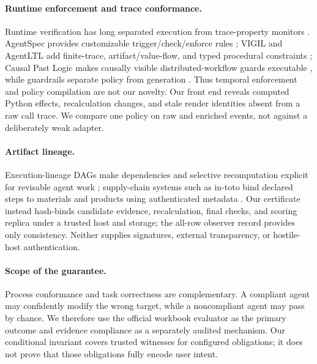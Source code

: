 \paragraph{Runtime enforcement and trace conformance.}
Runtime verification has long separated execution from trace-property monitors
\citep{leucker2009runtimeverification}. AgentSpec provides customizable
trigger/check/enforce rules \citep{wang2026agentspec}; VIGIL and AgentLTL add
finite-trace, artifact/value-flow, and typed procedural constraints
\citep{li2026vigil,elkoussy2026agentltl}; Causal Past Logic makes causally
visible distributed-workflow guards executable \citep{bollig2026causalpast},
while guardrails separate policy from generation \citep{rebedea2023nemo}.
Thus temporal enforcement and policy compilation are not our novelty. Our
front end reveals computed Python effects, recalculation changes, and stale
render identities absent from a raw call trace. We compare one policy on raw
and enriched events, not against a deliberately weak adapter.

\paragraph{Artifact lineage.}
Execution-lineage DAGs make dependencies and selective recomputation explicit
for revisable agent work \citep{rosen2026executionlineage}; supply-chain systems
such as in-toto bind declared steps to materials and products using authenticated
metadata \citep{torresarias2019intoto}. Our certificate instead hash-binds
candidate evidence, recalculation, final checks, and scoring replica under a
trusted host and storage; the all-row observer record provides only consistency.
Neither supplies signatures, external transparency, or hostile-host
authentication.



\paragraph{Scope of the guarantee.}
Process conformance and task correctness are complementary. A compliant agent
may confidently modify the wrong target, while a noncompliant agent may pass by
chance. We therefore use the official workbook evaluator as the primary outcome
and evidence compliance as a separately audited mechanism. Our conditional
invariant covers trusted witnesses for configured obligations; it does not
prove that those obligations fully encode user intent.
